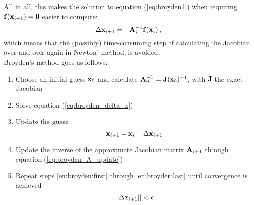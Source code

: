         All in all, this makes the solution to equation (\ref{eq:broyden1}) when requiring $\vb{f}(\vb{x}_{i+1}) = \vb{0}$ easier to compute:
        \begin{equation} \label{eq:broyden_delta_x}
            \Delta \vb{x}_{i+1} = - \vb{A}_i^{-1} \vb{f}(\vb{x}_i) \thinspace ,
        \end{equation}
        which means that the (possibly) time-consuming step of calculating the Jacobian over and over again in Newton' method, is avoided. \\

        Broyden's method goes as follows:
        \begin{enumerate}
            \item Choose an initial guess $\vb{x}_0$ and calculate $\vb{A}_0^{-1} = \vb{J}(\vb{x}_0)^{-1}$, with $\vb{J}$ the exact Jacobian
            \item \label{en:broyden:first} Solve equation (\ref{eq:broyden_delta_x})
            \item Update the guess
                \begin{equation}
                    \vb{x}_{i+1} = \vb{x}_i + \Delta \vb{x}_{i+1}
                \end{equation}
            \item \label{en:broyden:last} Update the inverse of the approximate Jacobian matrix $\vb{A}_{i+1}$ through equation (\ref{eq:broyden_A_update})
            \item Repeat steps \ref{en:broyden:first} through \ref{en:broyden:last} until convergence is achieved:
                \begin{equation}
                    || \Delta \vb{x}_{i+1} || < \epsilon
                \end{equation}
        \end{enumerate}

